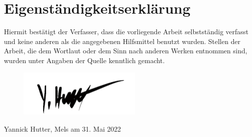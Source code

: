 \documentclass[12pt, oneside]{article}
\begin{document}
\clearpage
\section*{Eigenständigkeitserklärung}
Hiermit bestätigt der Verfasser, dass die vorliegende Arbeit selbstständig verfasst und keine anderen als die angegebenen Hilfsmittel benutzt wurden. Stellen der Arbeit, die dem Wortlaut oder dem Sinn nach anderen Werken entnommen sind, wurden unter Angaben der Quelle kenntlich gemacht.

\begin{figure}[ht]
    \includegraphics[width=6cm]{images/signature.png}
\end{figure}
Yannick Hutter, Mels am 31. Mai 2022
\end{document}
